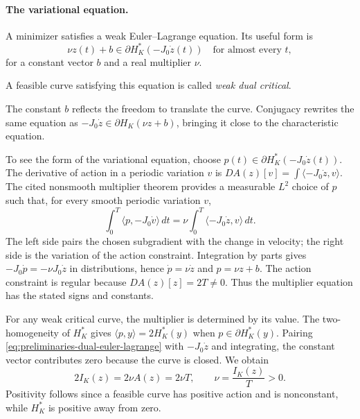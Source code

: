 \paragraph{The variational equation.}
A minimizer satisfies a weak Euler--Lagrange equation. Its useful form is
\begin{equation}\label{eq:preliminaries-dual-euler-lagrange}
 \nu z(t)+b\in\partial H_K^*(-J_0\dot z(t))
 \quad\text{for almost every }t,
\end{equation}
for a constant vector $b$ and a real multiplier $\nu$.
\begin{definition}
\label{def:preliminaries-weak-dual-critical}
A feasible curve
satisfying this equation is called \emph{weak dual critical}.
\end{definition}
The constant $b$ reflects the freedom to translate the curve. Conjugacy
rewrites the same equation as
$-J_0\dot z\in\partial H_K(\nu z+b)$, bringing it close to the
characteristic equation.

To see the form of the variational equation, choose
$p(t)\in\partial H_K^*(-J_0\dot z(t))$. The derivative of action in a
periodic variation $v$ is $DA(z)[v]=\int\langle-J_0\dot z,v\rangle$.
The cited nonsmooth multiplier theorem provides a measurable $L^2$ choice
of $p$ such that, for every smooth periodic variation $v$,
\[
 \int_0^T\langle p,-J_0\dot v\rangle\,dt
 =\nu\int_0^T\langle-J_0\dot z,v\rangle\,dt.
\]
The left side pairs the chosen subgradient with the change in velocity;
the right side is the variation of the action constraint.
Integration by parts gives
$-J_0\dot p=-\nu J_0\dot z$ in distributions, hence
$\dot p=\nu\dot z$ and $p=\nu z+b$. The action constraint is regular
because $DA(z)[z]=2T\ne0$. Thus the multiplier equation has the stated signs and constants.

For any weak critical curve, the multiplier is determined by its value.
The two-homogeneity of $H_K^*$ gives
$\langle p,y\rangle=2H_K^*(y)$ when $p\in\partial H_K^*(y)$.
Pairing \eqref{eq:preliminaries-dual-euler-lagrange} with $-J_0\dot z$
and integrating, the constant vector contributes zero because the curve
is closed. We obtain
\begin{equation}\label{eq:preliminaries-dual-multiplier-value}
 2I_K(z)=2\nu A(z)=2\nu T,
 \qquad \nu=\frac{I_K(z)}{T}>0.
\end{equation}
Positivity follows since a feasible curve has positive action and is
nonconstant, while $H_K^*$ is positive away from zero.

